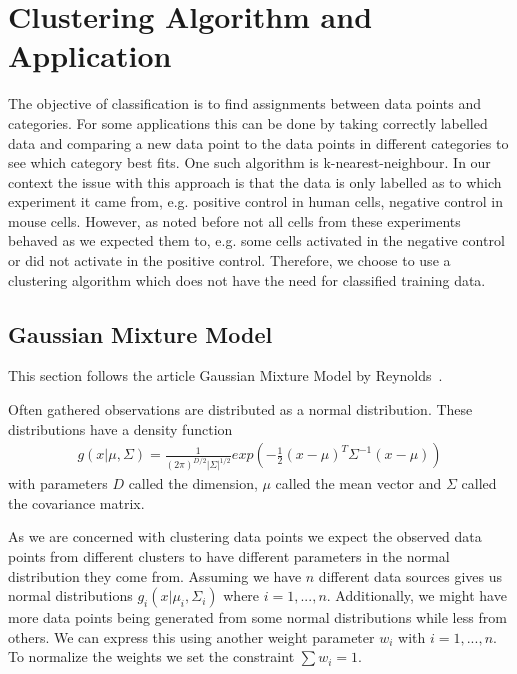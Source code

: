 \chapter{Clustering Algorithm and Application}
\label{chapter:clustering}

The objective of classification is to find assignments between data points and categories. For some applications this can be done by taking correctly labelled data and comparing a new data point to the data points in different categories to see which category best fits. One such algorithm is k-nearest-neighbour. In our context the issue with this approach is that the data is only labelled as to which experiment it came from, e.g. positive control in human cells, negative control in mouse cells. However, as noted before not all cells from these experiments behaved as we expected them to, e.g. some cells activated in the negative control or did not activate in the positive control. Therefore, we choose to use a clustering algorithm which does not have the need for classified training data.

\section{Gaussian Mixture Model}
\label{sec:gaussian_mixture_model}

This section follows the article Gaussian Mixture Model by Reynolds~\cite{reynolds2009}.

Often gathered observations are distributed as a normal distribution. These distributions have a density function
\begin{align*}
	g(x|\mu, \Sigma) = \frac{1}{(2\pi)^{D/2} |\Sigma|^{1/2}} exp\left( - \frac{1}{2} (x-\mu)^T \Sigma^{-1} (x-\mu) \right)
\end{align*}
with parameters $D$ called the dimension, $\mu$ called the mean vector and $\Sigma$ called the covariance matrix.

As we are concerned with clustering data points we expect the observed data points from different clusters to have different parameters in the normal distribution they come from. Assuming we have $n$ different data sources gives us normal distributions $g_i(x|\mu_i, \Sigma_i)$ where $i=1, ..., n$. Additionally, we might have more data points being generated from some normal distributions while less from others. We can express this using another weight parameter $w_i$ with $i=1, ..., n$. To normalize the weights we set the constraint $\sum w_i = 1$.

